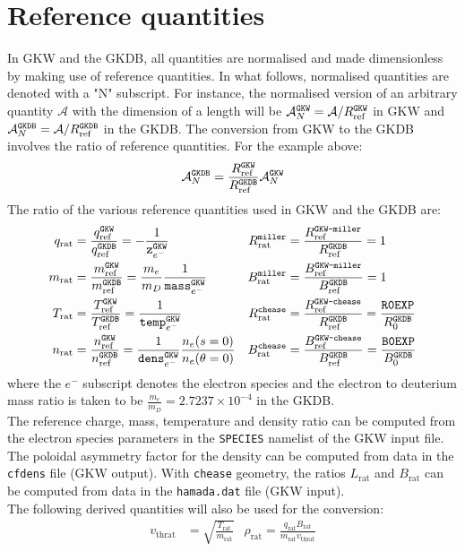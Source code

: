 \documentclass[a4paper]{report}
\begin{document}
\section{Reference quantities}
In GKW and the GKDB, all quantities are normalised and made dimensionless by making use of reference quantities. In what follows, normalised quantities are denoted with a "N" subscript. For instance, the normalised version of an arbitrary quantity $\mathcal{A}$ with the dimension of a length will be $\mathcal{A}_N^{\texttt{GKW}}=\mathcal{A}/R_{\textrm{ref}}^{\texttt{GKW}}$ in GKW and $\mathcal{A}_N^{\texttt{GKDB}}=\mathcal{A}/R_{\textrm{ref}}^{\texttt{GKDB}}$ in the GKDB. The conversion from GKW  to the GKDB  involves the ratio of reference quantities. For the example above:
\begin{equation}
\mathcal{A}_N^{\texttt{GKDB}} = \frac{R_{\textrm{ref}}^{\texttt{GKW}}}{R_{\textrm{ref}}^{\texttt{GKDB}}} \mathcal{A}_N^{\texttt{GKW}}
\end{equation}
The ratio of the various reference quantities used in GKW and the GKDB are:
\begin{align*}
q_\textrm{rat} &=  \frac{q_{\textrm{ref}}^{\texttt{GKW}}}{q_{\textrm{ref}}^{\texttt{GKDB}}} = - \frac{1}{\texttt{z}^{\texttt{GKW}}_{e^-}} & R_\textrm{rat}^\texttt{miller} &= \frac{R_{\textrm{ref}}^\texttt{GKW-miller}}{R_{\textrm{ref}}^{\texttt{GKDB}}} = 1 \\
m_\textrm{rat} &=  \frac{m_{\textrm{ref}}^{\texttt{GKW}}}{m_{\textrm{ref}}^{\texttt{GKDB}}} = \frac{m_e}{m_D}\frac{1}{\texttt{mass}^{\texttt{GKW}}_{e^-}} & B_\textrm{rat}^\texttt{miller} &= \frac{B_{\textrm{ref}}^\texttt{GKW-miller}}{B_{\textrm{ref}}^{\texttt{GKDB}}} = 1 \\
T_\textrm{rat} &=  \frac{T_{\textrm{ref}}^{\texttt{GKW}}}{T_{\textrm{ref}}^{\texttt{GKDB}}} = \frac{1}{\texttt{temp}^{\texttt{GKW}}_{e^-}} &R_\textrm{rat}^\texttt{chease} &= \frac{R_{\textrm{ref}}^\texttt{GKW-chease}}{R_{\textrm{ref}}^{\texttt{GKDB}}} = \frac{\texttt{R0EXP}}{R_0^{\texttt{GKDB}}}  \\
n_\textrm{rat} &=  \frac{n_{\textrm{ref}}^{\texttt{GKW}}}{n_{\textrm{ref}}^{\texttt{GKDB}}} = \frac{1}{\texttt{dens}^{\texttt{GKW}}_{e^-}} \frac{n_e(s=0)}{n_e(\theta=0)} & B_\textrm{rat}^\texttt{chease} &= \frac{B_{\textrm{ref}}^\texttt{GKW-chease}}{B_{\textrm{ref}}^{\texttt{GKDB}}} = \frac{\texttt{B0EXP}}{B_0^{\texttt{GKDB}}}
\end{align*}
where the $e^-$ subscript denotes the electron species and the electron to deuterium mass ratio is taken to be $\frac{m_e}{m_D}=2.7237 \times 10^{-4}$ in the GKDB.\\
The reference charge, mass, temperature and density ratio can be computed from the electron species parameters in the \texttt{SPECIES} namelist of the GKW input file. The poloidal asymmetry factor for the density can be computed from data in the \texttt{cfdens} file (GKW output).  With \texttt{chease} geometry, the ratios $ L_\textrm{rat}$ and $ B_\textrm{rat}$ can be computed from data in the \texttt{hamada.dat} file (GKW input).\\
The following derived quantities will also be used for the conversion:
\begin{align*}
v_\textrm{thrat} &= \sqrt{\frac{T_\textrm{rat}}{m_\textrm{rat}}} & \rho_\textrm{rat} = \frac{q_\textrm{rat} B_\textrm{rat}}{m_\textrm{rat}v_\textrm{thrat}}
\end{align*}
\end{document}
